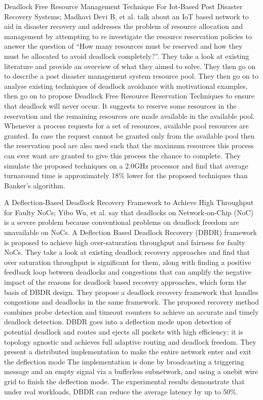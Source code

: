 \documentclass[sigplan,screen]{acmart}
\begin{document}
Deadlock Free Resource Management Technique For Iot-Based Post Disaster Recovery Systems; Madhavi Devi B, et al. talk about an IoT based network to aid in disaster recovery and addresses the problem of resource allocation and management by attempting to re investigate the resource reservation policies to answer the question of “How many resources must be reserved and how they must be allocated to avoid deadlock completely?”. They take a look at existing literature and provide an overview of what they aimed to solve. They then go on to describe a post disaster management system resource pool. They then go on to analyse existing techniques of deadlock avoidance with motivational examples, then go on to propose Deadlock Free Resource Reservation Techniques to ensure that deadlock will never occur. It suggests to reserve some resources in the reservation and the remaining resources are made available in the available pool. Whenever a process requests for a set of resources, available pool resources are granted. In case the request cannot be granted only from the available pool then the reservation pool are also used such that the maximum resources this process can ever want are granted to give this process the chance to complete. They simulate the proposed techniques on a 2.0GHz processor and find that average turnaround time is approximately 18\% lower for the proposed techniques than Banker’s algorithm.
\par
A Deflection-Based Deadlock Recovery Framework to Achieve High Throughput for Faulty NoCs; Yibo Wu, et al. say that deadlocks on Network-on-Chip (NoC) is a severe problem because conventional problems on deadlock freedom are unavailable on NoCs. A Deflection Based Deadlock Recovery (DBDR) framework is proposed to achieve high over-saturation throughput and fairness for faulty NoCs. They take a look at existing deadlock recovery approaches and find that over saturation throughput is significant for them, along with finding a positive feedback loop between deadlocks and congestions that can amplify the negative impact of the reasons for deadlock based recovery approaches, which form the basis of DBDR design. They propose a deadlock recovery framework that handles congestions and deadlocks in the same framework. The proposed recovery method combines probe detection and timeout counters to achieve an accurate and timely deadlock detection. DBDR goes into a deflection mode upon detection of potential deadlock and routes and ejects all packets with high efficiency; it is topology agnostic  and achieves full adaptive routing  and deadlock freedom. They present a distributed implementation to make the entire network enter and exit the deflection mode The implementation is done by broadcasting a triggering message and an empty signal via a bufferless subnetwork, and using a onebit wire grid to finish the deflection mode. The experimental results demonstrate that under real workloads, DBDR can reduce the average latency by up to 50\%.
\end{document}

